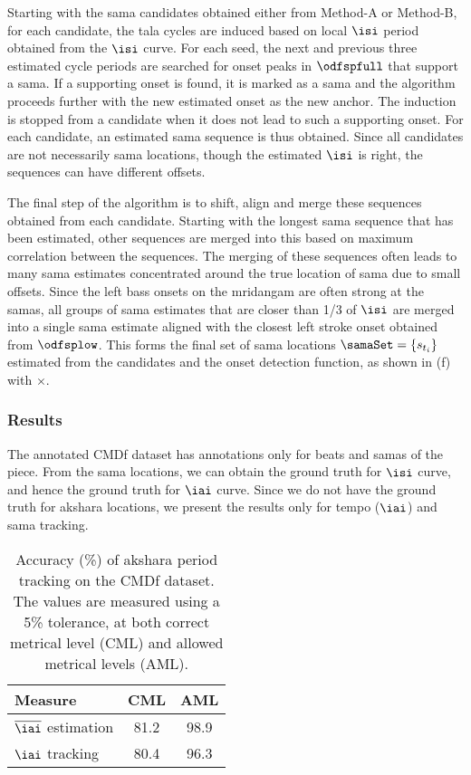 Starting with the \gls{sama} candidates obtained either from Method-A or Method-B, for each candidate, the \gls{tala} cycles are induced based on local $\isi$ period obtained from the $\isi$ curve. For each seed, the next and previous three estimated cycle periods are searched for onset peaks in $\odfspfull$ that support a \gls{sama}. If a supporting onset is found, it is marked as a \gls{sama} and the algorithm proceeds further with the new estimated onset as the new anchor. The induction is stopped from a candidate when it does not lead to such a supporting onset. For each candidate, an estimated \gls{sama} sequence is thus obtained. Since all candidates are not necessarily \gls{sama} locations, though the estimated $\isi$ is right, the sequences can have different offsets. 

The final step of the algorithm is to shift, align and merge these sequences obtained from each candidate. Starting with the longest \gls{sama} sequence that has been estimated, other sequences are merged into this based on maximum correlation between the sequences. The merging of these sequences often leads to many \gls{sama} estimates concentrated around the true location of \gls{sama} due to small offsets. Since the left bass onsets on the mridangam are often strong at the \glspl{sama}, all groups of \gls{sama} estimates that are closer than 1/3 of $\isi$ are merged into a single \gls{sama} estimate aligned with the closest left stroke onset obtained from $\odfsplow$. This forms the final set of \gls{sama} locations $\samaSet = \{s_{t_i}\}$ estimated from the candidates and the onset detection function, as shown in (f) with $\times$. 
\subsubsection{Results}
The annotated \acrshort{CMDf} dataset has annotations only for beats and \glspl{sama} of the piece. From the \gls{sama} locations, we can obtain the ground truth for $\isi$ curve, and hence the ground truth for $\iai$ curve. Since we do not have the ground truth for \gls{akshara} locations, we present the results only for tempo ($\iai$) and \gls{sama} tracking. 
\begin{table}
\centering
\begin{tabular}{@{}lcc@{}}\toprule
Measure & \gls{CML} & \gls{AML} \tabularnewline \midrule
$\overline{\iai}$ estimation & 81.2 & 98.9 \tabularnewline
$\iai$ tracking & 80.4 & 96.3 \tabularnewline \bottomrule
\end{tabular}
\caption[Results of \protect\gls{akshara} period tracking on \protect\acrshort{CMDf} dataset]{Accuracy (\%) of \protect\gls{akshara} period tracking on the \protect\acrshort{CMDf} dataset. The values are measured using a 5\% tolerance, at both correct metrical level (\gls{CML}) and allowed metrical levels (\gls{AML}).}\label{tab:APPtrack:icassp14}
\end{table}

